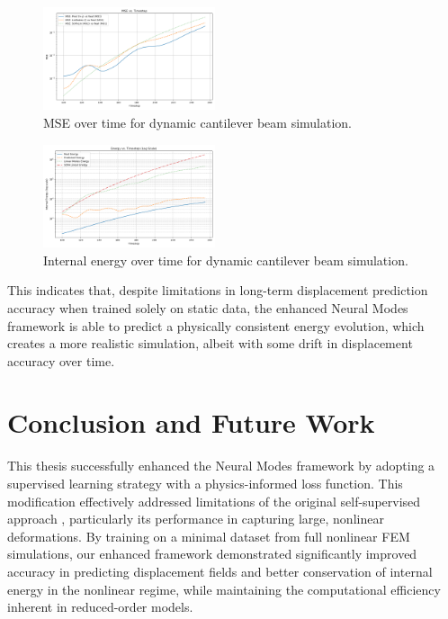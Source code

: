 \documentclass[11pt,a4paper,twocolumn]{article}
\begin{document}
\begin{figure}[H]
    \centering
    \includegraphics[width=0.45\textwidth]{Images/beam_dynamic_mse.png}
    \caption{MSE over time for dynamic cantilever beam simulation.}
    \label{fig:dynamic_validation_mse_comparison}
\end{figure}

\begin{figure}[htb]
    \centering
    \includegraphics[width=0.45\textwidth]{Images/beam_dynamic_energy.png}
    \caption{Internal energy over time for dynamic cantilever beam simulation.}
    \label{fig:dynamic_validation_energy_comparison}
\end{figure}

This indicates that, despite limitations in long-term displacement prediction accuracy when trained solely on static data, the enhanced Neural Modes framework is able to predict a physically consistent energy evolution, which creates a more realistic simulation, albeit with some drift in displacement accuracy over time. 

\section{Conclusion and Future Work}
\label{sec:es:conclusion}

This thesis successfully enhanced the Neural Modes framework by adopting a supervised learning strategy with a physics-informed loss function. This modification effectively addressed limitations of the original self-supervised approach \cite{Wang_Du_Coros_Thomaszewski_2024}, particularly its performance in capturing large, nonlinear deformations. By training on a minimal dataset from full nonlinear FEM simulations, our enhanced framework demonstrated significantly improved accuracy in predicting displacement fields and better conservation of internal energy in the nonlinear regime, while maintaining the computational efficiency inherent in reduced-order models.
\end{document}
